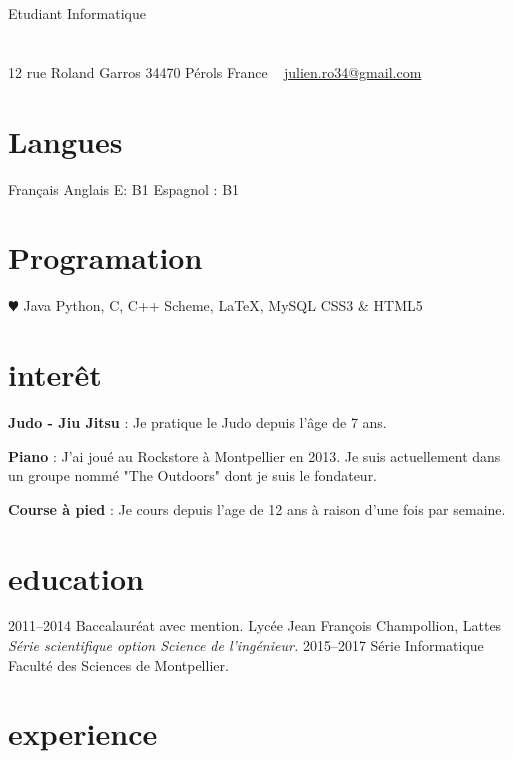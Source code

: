 \documentclass[]{friggeri-cv}
\begin{document}
       {Etudiant Informatique}


\begin{aside}
  \section{}
    12 rue Roland Garros
    34470 Pérols
    France
    ~
    \href{mailto:julien.ro34@gmail.com}{julien.ro34@gmail.com}
  \section{Langues}
    Français
    Anglais E: B1
    Espagnol : B1
  \section{Programation}
    {\color{red} $\varheartsuit$} Java
    Python, C, C++
    Scheme, \LaTeX, MySQL 
    CSS3 \& HTML5
\end{aside}

\section{interêt}

{\textbf{Judo - Jiu Jitsu} : Je pratique le Judo depuis l'âge de 7 ans. }

{\textbf{Piano} : J'ai joué au Rockstore à Montpellier en 2013. Je suis actuellement dans un groupe nommé "The Outdoors" dont je suis le fondateur.}

{\textbf{Course à pied} : Je cours depuis l'age de 12 ans à raison d'une fois par semaine. }

\section{education}

\begin{entrylist}
  \entry
    {2011--2014}
    {Baccalauréat avec mention.}
    {Lycée Jean François Champollion, Lattes}
    {\emph{Série scientifique option Science de l'ingénieur.}}
  \entry
    {2015–2017}
    {Série Informatique}
    {Faculté des Sciences de Montpellier.}
    {}
  \end{entrylist}

\section{experience}
\end{document}
